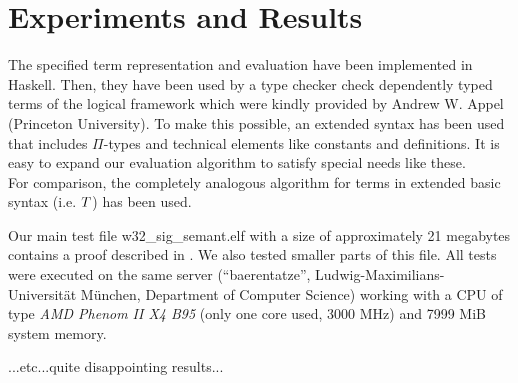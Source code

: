 \documentclass[submission,copyright,creativecommons]{eptcs}
\begin{document}
\section{Experiments and Results}

The specified term representation and evaluation have been implemented in Haskell. Then, they have been used by a type checker check dependently typed terms of the logical framework which were kindly provided by Andrew W. Appel (Princeton University). To make this possible, an extended syntax has been used that includes $\Pi$-types and technical elements like constants and definitions. It is easy to expand our evaluation algorithm to satisfy special needs like these.
\\
For comparison, the completely analogous algorithm for terms in extended basic syntax (i.e. $T$) has been used.

Our main test file \textsf{w32\_sig\_semant.elf} with a size of approximately 21 megabytes contains a proof described in \cite{appel}. We also tested smaller parts of this file.
All tests were executed on the same server (``baerentatze'', Ludwig-Maximilians-Universit\"at M\"unchen, Department of Computer Science) working with a CPU of type \emph{AMD Phenom II X4 B95} (only one core used, 3000 MHz) and 7999 MiB system memory.

...etc...quite disappointing results...
\end{document}
